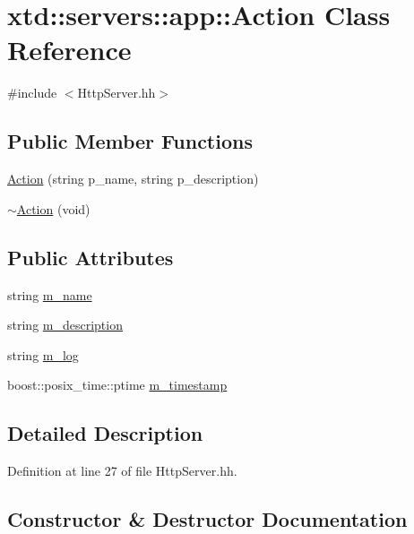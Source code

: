 \hypertarget{classxtd_1_1servers_1_1app_1_1Action}{}\section{xtd\+:\+:servers\+:\+:app\+:\+:Action Class Reference}
\label{classxtd_1_1servers_1_1app_1_1Action}


{\ttfamily \#include $<$Http\+Server.\+hh$>$}

\subsection*{Public Member Functions}
\begin{DoxyCompactItemize}
\item 
\hyperlink{classxtd_1_1servers_1_1app_1_1Action_aea5ec95c3aa4f39ac164507a0684b6c2}{Action} (string p\+\_\+name, string p\+\_\+description)
\item 
\hyperlink{classxtd_1_1servers_1_1app_1_1Action_a0859f1ac8244776126115daf388985af}{$\sim$\+Action} (void)
\end{DoxyCompactItemize}
\subsection*{Public Attributes}
\begin{DoxyCompactItemize}
\item 
string \hyperlink{classxtd_1_1servers_1_1app_1_1Action_a397748b5fd8412efcf779978ed4f4eef}{m\+\_\+name}
\item 
string \hyperlink{classxtd_1_1servers_1_1app_1_1Action_a78d15b580f1f537cc273f05500a823e8}{m\+\_\+description}
\item 
string \hyperlink{classxtd_1_1servers_1_1app_1_1Action_a8ac7e4975e2fde1bb9237454bd99faec}{m\+\_\+log}
\item 
boost\+::posix\+\_\+time\+::ptime \hyperlink{classxtd_1_1servers_1_1app_1_1Action_a3baf29675a2f46cf5946816cf6c9b7b6}{m\+\_\+timestamp}
\end{DoxyCompactItemize}


\subsection{Detailed Description}


Definition at line 27 of file Http\+Server.\+hh.



\subsection{Constructor \& Destructor Documentation}
